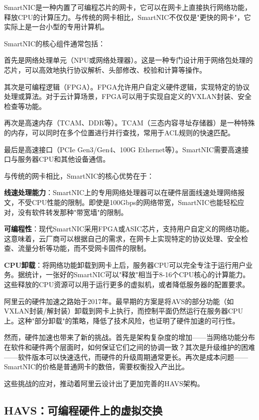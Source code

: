 SmartNIC是一种内置了可编程芯片的网卡，它可以在网卡上直接执行网络功能，释放CPU的计算压力。与传统的网卡相比，SmartNIC不仅仅是"更快的网卡"，它实际上是一台小型的专用计算机。

SmartNIC的核心组件通常包括：

首先是网络处理单元（NPU或网络处理器）。这是一种专门设计用于网络包处理的芯片，可以高效地执行协议解析、头部修改、校验和计算等操作。

其次是可编程逻辑（FPGA）。FPGA允许用户自定义硬件逻辑，实现特定的协议处理或算法。对于云计算场景，FPGA可以用于实现自定义的VXLAN封装、安全检查等功能。

再次是高速内存（TCAM、DDR等）。TCAM（三态内容寻址存储器）是一种特殊的内存，可以同时在多个位置进行并行查找，常用于ACL规则的快速匹配。

最后是高速接口（PCIe Gen3/Gen4、100G Ethernet等）。SmartNIC需要高速接口与服务器CPU和其他设备通信。

与传统的网卡相比，SmartNIC的核心优势在于：

\textbf{线速处理能力}：SmartNIC上的专用网络处理器可以在硬件层面线速处理网络报文，不受CPU性能的限制。即使是100Gbps的网络带宽，SmartNIC也能轻松应对，没有软件转发那种"带宽墙"的限制。

\textbf{可编程性}：现代SmartNIC采用FPGA或ASIC芯片，支持用户自定义的网络功能。这意味着，云厂商可以根据自己的需求，在网卡上实现特定的协议处理、安全检查、流量分析等功能，而不受网卡固件的限制。

\textbf{CPU卸载}：将网络功能卸载到网卡上后，服务器CPU可以完全专注于运行用户业务。据统计，一张好的SmartNIC可以"释放"相当于8-16个CPU核心的计算能力。这些释放的CPU资源可以用于运行更多的虚拟机，或者降低服务器的配置要求。

阿里云的硬件加速之路始于2017年。最早期的方案是将AVS的部分功能（如VXLAN封装/解封装）卸载到网卡上执行，而控制平面仍然运行在服务器CPU上。这种"部分卸载"的策略，降低了技术风险，也证明了硬件加速的可行性。

然而，硬件加速也带来了新的挑战。首先是架构复杂度的增加——当网络功能分布在软件和硬件两个层面时，如何保证它们之间的协调一致？其次是升级维护的困难——软件版本可以快速迭代，而硬件的升级周期通常更长。再次是成本问题——SmartNIC的价格是普通网卡的数倍，需要权衡投入产出比。

这些挑战的应对，推动着阿里云设计出了更加完善的HAVS架构。

\subsection{HAVS：可编程硬件上的虚拟交换}

